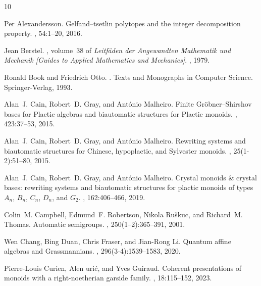 \documentclass[a4paper, twoside, 11pt, english]{article}
\theoremstyle{plain}
\theoremstyle{definition}
\begin{document}
\begin{small}
\renewcommand{\refname}{\Large\textsc{References}}

\def\cprime{$'$}
\begin{thebibliography}{10}

Per Alexandersson.
\newblock Gelfand--tsetlin polytopes and the integer decomposition property.
, 54:1--20, 2016.

Jean Berstel.
, volume~38 of {\em
  Leitf{\"a}den der Angewandten Mathematik und Mechanik [Guides to Applied
  Mathematics and Mechanics]}.
, 1979.

Ronald Book and Friedrich Otto.
.
\newblock Texts and Monographs in Computer Science. Springer-Verlag, 1993.

Alan~J. Cain, Robert~D. Gray, and Ant{\'o}nio Malheiro.
\newblock Finite {G}r\"obner--{S}hirshov bases for {P}lactic algebras and
  biautomatic structures for {P}lactic monoids.
, 423:37--53, 2015.

Alan~J. Cain, Robert~D. Gray, and Ant{\'o}nio Malheiro.
\newblock Rewriting systems and biautomatic structures for {C}hinese,
  hypoplactic, and {S}ylvester monoids.
, 25(1-2):51--80, 2015.

Alan~J. Cain, Robert~D. Gray, and Ant\'{o}nio Malheiro.
\newblock Crystal monoids \& crystal bases: rewriting systems and biautomatic
  structures for plactic monoids of types {$A_n$}, {$B_n$}, {$C_n$}, {$D_n$},
  and {$G_2$}.
, 162:406--466, 2019.

Colin~M. Campbell, Edmund~F. Robertson, Nikola Ru\v{s}kuc, and Richard~M. Thomas.
\newblock Automatic semigroups.
, 250(1--2):365--391, 2001.

Wen Chang, Bing Duan, Chris Fraser, and Jian-Rong Li.
\newblock Quantum affine algebras and {G}rassmannians.
, 296(3-4):1539--1583, 2020.

Pierre-Louis Curien, Alen {\DH}uri{\'c}, and Yves Guiraud.
\newblock Coherent presentations of monoids with a right-noetherian garside
  family.
, 18:115--152, 2023.


\end{thebibliography}
\end{small}
\end{document}
